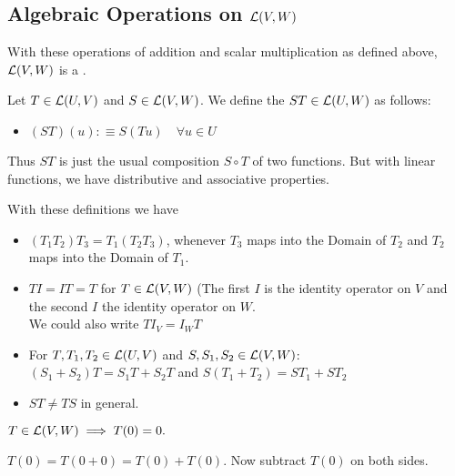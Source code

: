 \subsection{Algebraic Operations on $\mathcal{L}(V,W)$}
\setcounter{thm}{5}
\begin{thm} [$\lvw$]
  With these operations of addition and scalar multiplication as defined above, $\lvw$ is a \vs.
\end{thm}

\setcounter{thm}{6}
\begin{mydef}
  Let $T \in {\mathcal{L}(U, V)}$ and $S \in {\mathcal{L}(V, W)}$. We define the  $ST \in {\mathcal{L}(U, W)}$ as follows:
  \begin{itemize}
    \item[] $(ST)(u) :\equiv S(Tu) \quad \forall u \in U$
  \end{itemize}
  Thus $ST$ is just the usual composition  $S \circ T$ of two functions. But with linear functions, we have distributive and associative properties. 
\end{mydef}

\begin{thm} 
  With these definitions we have
  \begin{itemize}
    \item {} $(T_1 T_2) T_3 = T_1 (T_2 T_3)$, whenever $T_3$ maps into the Domain of $T_2$ and $T_2$ maps into the Domain of $T_1$.
    \item {} $T I = I T = T$ for $T \in {\mathcal{L}(V,W)}$ (The first $I$ is the identity operator on $V$ and the second $I$ the identity operator on $W$. \\
    We could also write $T I_V = I_W T$
    \item {} For $T, T_1, T_2 \in {\mathcal{L}(U, V)}$ and $S, S_1, S_2 \in {\mathcal{L}(V, W)}$: \\ $(S_1 + S_2)T=S_1 T + S_2 T$ and $S(T_1 + T_2)=S T_1 + S T_2$
    \item {} $ST \neq TS$ in general.
  \end{itemize}
\end{thm}

\setcounter{thm}{9}
\begin{thm} 
  $T\in {\mathcal{L}(V,W)} \implies T(0)=0.$
\end{thm}
\begin{prf}
  $T(0) = T(0+0) = T(0) + T(0)$. Now subtract $T(0)$ on both sides.
\end{prf}